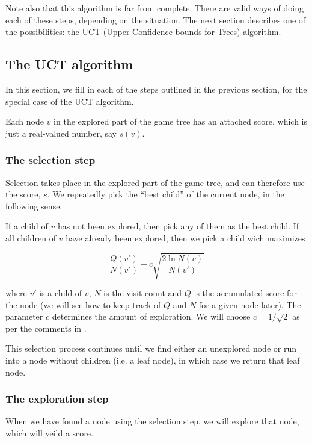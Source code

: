 Note also that this algorithm is far from complete. There are valid ways of doing each of these steps, depending on the situation.
The next section describes one of the possibilities: the UCT (Upper Confidence bounds for Trees) algorithm.


\subsection{The UCT algorithm}

In this section, we fill in each of the steps outlined in the previous section, for the special case of the UCT algorithm.


Each node $v$ in the explored part of the game tree has an attached score, which is just a real-valued number, say $s(v)$.


\subsubsection{The selection step}

Selection takes place in the explored part of the game tree, and can therefore use the score, $s$.
We repeatedly pick the ``best child'' of the current node, in the following sense.

If a child of $v$ has not been explored, then pick any of them as the best child.
If all children of $v$ have already been explored, then we pick a child wich maximizes

\begin{equation}
\label{eq:uctnodevalue}
\frac{Q(v')}{N(v')} + c\sqrt{\frac{2\ln{N(v)}}{N(v')}}
\end{equation} 


where $v'$ is a child of $v$, $N$ is the visit count and $Q$ is the accumulated score for the node (we will see how to keep track of $Q$ and $N$ for a given node later).
The parameter $c$ determines the amount of exploration. We will choose $c = 1 / \sqrt 2$ as per the comments in \citep[p. 9]{mcts_survey12}.

This selection process continues until we find either an unexplored node or run into a node without children (i.e. a leaf node), in which case we return that leaf node.

\subsubsection{The exploration step}

When we have found a node using the selection step, we will explore that node, which will yeild a score.

